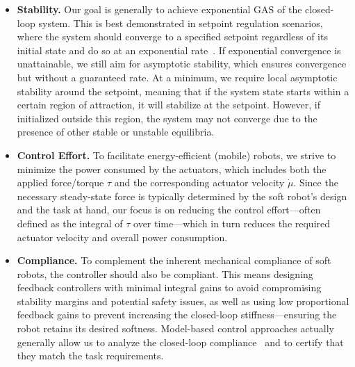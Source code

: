 \begin{itemize}
    \item \textbf{Stability.}  Our goal is generally to achieve exponential \gls{GAS} of the closed-loop system. This is best demonstrated in setpoint regulation scenarios, where the system should converge to a specified setpoint regardless of its initial state and do so at an exponential rate~\citep{khalil2002nonlinear}. If exponential convergence is unattainable, we still aim for asymptotic stability, which ensures convergence but without a guaranteed rate. At a minimum, we require local asymptotic stability around the setpoint, meaning that if the system state starts within a certain region of attraction, it will stabilize at the setpoint. However, if initialized outside this region, the system may not converge due to the presence of other stable or unstable equilibria.
    \item \textbf{Control Effort.} 
    To facilitate energy-efficient (mobile) robots, we strive to minimize the power consumed by the actuators, which includes both the applied force/torque $\tau$ and the corresponding actuator velocity $\dot{\mu}$. Since the necessary steady-state force is typically determined by the soft robot’s design and the task at hand, our focus is on reducing the control effort—often defined as the integral of $\tau$ over time—which in turn reduces the required actuator velocity and overall power consumption.
    \item \textbf{Compliance.} 
    To complement the inherent mechanical compliance of soft robots, the controller should also be compliant. This means designing feedback controllers with minimal integral gains to avoid compromising stability margins and potential safety issues, as well as using low proportional feedback gains to prevent increasing the closed-loop stiffness—ensuring the robot retains its desired softness. Model-based control approaches actually generally allow us to analyze the closed-loop compliance~\citep{stella2023prescribing} and to certify that they match the task requirements.

\end{itemize}
